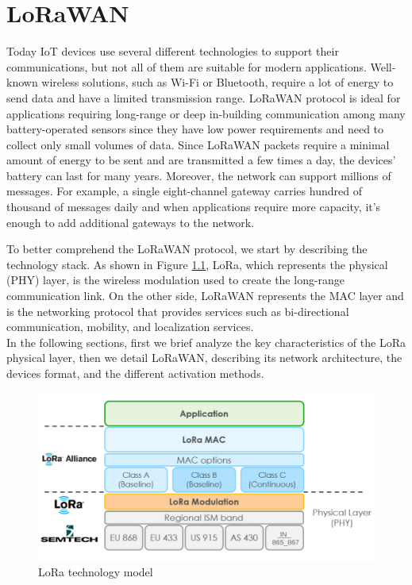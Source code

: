 \chapter{LoRaWAN}
\label{lorawan}
Today IoT devices use several different technologies to support their communications, but not all of them are suitable for modern applications. Well-known wireless solutions, such as Wi-Fi or Bluetooth, require a lot of energy to send data and have a limited transmission range. LoRaWAN protocol is ideal for applications requiring long-range or deep in-building communication among many battery-operated sensors since they have low power requirements and need to collect only small volumes of data. Since LoRaWAN packets require a minimal amount of energy to be sent and are transmitted a few times a day, the devices' battery can last for many years. Moreover, the network can support millions of messages. For example, a single eight-channel gateway carries hundred of thousand of messages daily and when applications require more capacity, it's enough to add additional gateways to the network.

\vspace{5mm}

To better comprehend the LoRaWAN protocol, we start by describing the technology stack. As shown in Figure \ref{fig:stack}, LoRa, which represents the physical (PHY) layer, is the wireless modulation used to create the long-range communication link. On the other side, LoRaWAN represents the MAC layer and is the networking protocol that provides services such as bi-directional communication, mobility, and localization services.
\\
In the following sections, first we brief analyze the key characteristics of the LoRa physical layer, then we detail LoRaWAN, describing its network architecture, the devices format, and the different activation methods.
\begin{figure}
    \centering
    \includegraphics[width=0.7\linewidth]{images/lorawan/protocol_stack.png}
    \caption{LoRa technology model}
    \label{fig:stack}
\end{figure}

